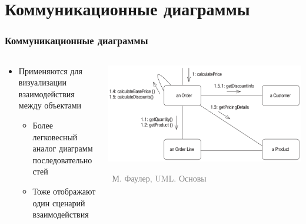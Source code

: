 \documentclass[xetex,mathserif,serif]{beamer}
\newcommand{\attribution}[1] {
    \vspace{-5mm}\begin{flushright}\begin{scriptsize}\textcolor{gray}{\textcopyright\, #1}\end{scriptsize}\end{flushright}
}
\begin{document}
    \section{Коммуникационные диаграммы}

    \begin{frame}
        \frametitle{Коммуникационные диаграммы}
        \begin{columns}
            \begin{column}{0.5\textwidth}
                \begin{itemize}
                    \item Применяются для визуализации взаимодействия между объектами
                    \begin{itemize}
                        \item Более легковесный аналог диаграмм последовательностей
                        \item Тоже отображают один сценарий взаимодействия
                    \end{itemize}
                \end{itemize}
            \end{column}
            \begin{column}{0.5\textwidth}
                \begin{center}
                    \includegraphics[width=\textwidth]{communicationDiagram.png}
                    \attribution{М. Фаулер, UML. Основы}
                \end{center}
            \end{column}
        \end{columns}
    \end{frame}
\end{document}
